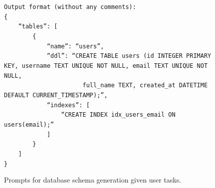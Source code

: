 \begin{figure}[p]
{\begin{minipage}{0.97\textwidth}
        \texttt{Output format (without any comments):}\\
        \texttt{\{}\\
        \texttt{~~~~``tables'': [}\\
        \texttt{~~~~~~~~\{}\\
        \texttt{~~~~~~~~~~~~``name'': ``users'',}\\
        \texttt{~~~~~~~~~~~~``ddl'': ``CREATE TABLE users (id INTEGER PRIMARY KEY, username TEXT UNIQUE NOT NULL, email TEXT UNIQUE NOT NULL,}\\
        \texttt{~~~~~~~~~~~~~~~~~~~~~~full\_name TEXT, created\_at DATETIME DEFAULT CURRENT\_TIMESTAMP);'',}\\
        \texttt{~~~~~~~~~~~~``indexes'': [}\\
        \texttt{~~~~~~~~~~~~~~~~``CREATE INDEX idx\_users\_email ON users(email);''}\\
        \texttt{~~~~~~~~~~~~]}\\
        \texttt{~~~~~~~~\}}\\
        \texttt{~~~~]}\\
        \texttt{\}}

        \vspace{1pt}
        \end{minipage}
    }
    \captionsetup{labelformat=default, name=Figure}
    \caption{Prompts for database schema generation given user tasks.}
    \label{fig:gen-db}
\end{figure}
